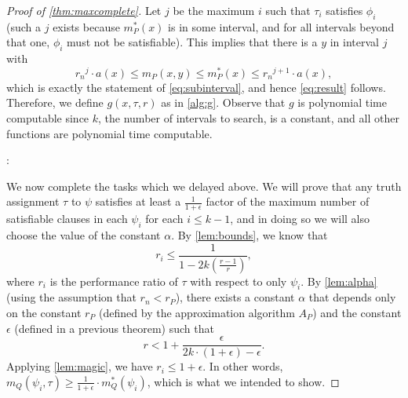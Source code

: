 \documentclass[]{article}
\begin{document}
\begin{proof}[Proof of \autoref{thm:maxcomplete}]
  Let $j$ be the maximum $i$ such that $\tau_i$ satisfies $\phi_i$ (such a $j$ exists because $m^*_P(x)$ is in some interval, and for all intervals beyond that one, $\phi_i$ must not be satisfiable).
  This implies that there is a $y$ in interval $j$ with
  \begin{equation*}
    {r_n}^j \cdot a(x) \leq m_P(x, y) \leq m^*_P(x) \leq {r_n}^{j + 1} \cdot a(x),
  \end{equation*}
  which is exactly the statement of \autoref{eq:subinterval}, and hence \autoref{eq:result} follows.
  Therefore, we define $g(x, \tau, r)$ as in \autoref{alg:g}.
  Observe that $g$ is polynomial time computable since $k$, the number of intervals to search, is a constant, and all other functions are polynomial time computable.
  \begin{algorithm}
    \caption{Deterministic polynomial time algorithm that computes a $r_n$-approximate solution for $x$%
      \label{alg:g}}
    \begin{algorithmic}[1]
      \Statex{}
      :
        \EndFor
         \\
        \hspace{1.5em}
      \EndFunction
    \end{algorithmic}
  \end{algorithm}

  We now complete the tasks which we delayed above.
  We will prove that any truth assignment $\tau$ to $\psi$ satisfies at least a $\frac{1}{1 + \epsilon}$ factor of the maximum number of satisfiable clauses in each $\psi_i$ for each $i \leq k - 1$, and in doing so we will also choose the value of the constant $\alpha$.
  By \autoref{lem:bounds}, we know that
  \begin{equation*}
    r_i \leq \frac{1}{1 - 2k\left(\frac{r - 1}{r}\right)},
  \end{equation*}
  where $r_i$ is the performance ratio of $\tau$ with respect to only $\psi_i$.
  By \autoref{lem:alpha} (using the assumption that $r_n < r_P$), there exists a constant $\alpha$ that depends only on the constant $r_P$ (defined by the approximation algorithm $A_P$) and the constant $\epsilon$ (defined in a previous theorem) such that
  \begin{equation}\label{eq:rupper}
    r < 1 + \frac{\epsilon}{2k \cdot (1 + \epsilon) - \epsilon}.
  \end{equation}
  Applying \autoref{lem:magic}, we have $r_i \leq 1 + \epsilon$.
  In other words, $m_Q(\psi_i, \tau) \geq \frac{1}{1 + \epsilon} \cdot m^*_Q(\psi_i)$, which is what we intended to show.


\end{proof}
\end{document}

